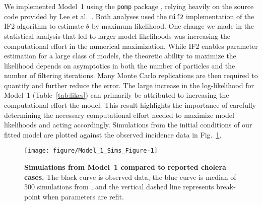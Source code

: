 \documentclass[10pt,letterpaper]{article}\usepackage[]{graphicx}\usepackage[table]{xcolor}
\makeatletter
\def\maxwidth{ %
  \ifdim\Gin@nat@width>\linewidth
    \linewidth
  \else
    \Gin@nat@width
  \fi
}
\newenvironment{knitrout}{}{} %
\newcommand\code[1]{\texttt{#1}}
\newcommand\figTitle{\bf}
\newcommand\paramVec{\theta}
\makeatother
\begin{document}
We implemented Model~1 using the \code{pomp} package \cite{king16}, relying heavily on the \old{\code{pomp}} source code provided by Lee et al.~\cite{lee20}.
Both analyses used the \code{mif2} implementation of the IF2 algorithm to estimate $\paramVec$ by maximum likelihood.
One change we made in the statistical analysis that led to larger model likelihoods was increasing the computational effort in the numerical maximization.
While IF2 enables parameter estimation for a large class of models, the theoretic ability to maximize the likelihood depends on asymptotics in both the number of particles and the number of filtering iterations.
Many Monte Carlo replications are then required to quantify and further reduce the error.
The large increase in the log-likelihood for Model~1 (Table~\ref{tab:likes}) can primarily be attributed to increasing the computational effort   the model.
This result highlights the importance of carefully determining the necessary computational effort needed to maximize model likelihoods and acting accordingly.
Simulations from the initial conditions of our fitted model are plotted against the observed incidence data in Fig.~\ref{fig:mod1fit}.

\begin{figure}[!h]
\centering
\begin{knitrout}
\color{fgcolor}

{\centering \texttt{[image: figure/Model\_1\_Sims\_Figure-1]} 

}


\end{knitrout}
\caption{\label{fig:mod1fit}
{\figTitle Simulations from Model~1 compared to reported cholera cases.}
The black curve is observed data, the blue curve is median of 500 simulations from  , and the vertical dashed line represents break-point when parameters are refit.
}
\end{figure}
\end{document}
